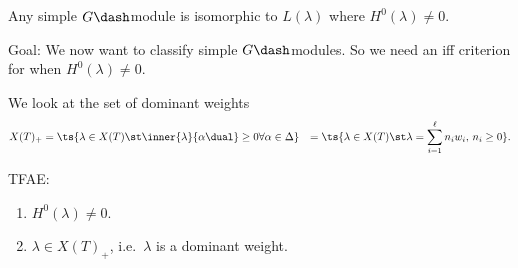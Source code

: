 \begin{remark}

Any simple \(G\dash\)module is isomorphic to \(L(\lambda)\) where
\(H^0(\lambda) \neq 0\).

\end{remark}

Goal: We now want to classify simple \(G\dash\)modules. So we need an
iff criterion for when \(H^0(\lambda) \neq 0\).

We look at the set of dominant weights
\begin{align*}  
X(T)_+ 
&= \ts{\lambda \in X(T) \st \inner{\lambda}{\alpha\dual}\geq 0 \forall \alpha\in\Delta}
&= \ts{\lambda \in X(T) \st \lambda = \sum_{i=1}^\ell n_i w_i,\, n_i \geq 0}
.\end{align*}

\begin{theorem}[?]

TFAE:

\begin{enumerate}
\def\labelenumi{\arabic{enumi}.}
\tightlist
\item
  \(H^0(\lambda) \neq 0\).
\item
  \(\lambda \in X(T)_+\), i.e.~\(\lambda\) is a dominant weight.
\end{enumerate}

\end{theorem}


